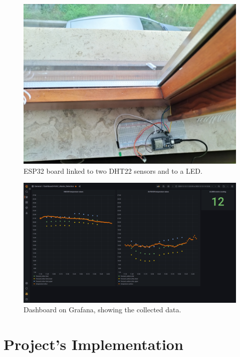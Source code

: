 \documentclass[conference]{IEEEtran}
\begin{document}
\begin{figure}[htbp]
\centerline{\includegraphics[scale=0.06]{figures/figure_esp.jpg}}
\caption{ESP32 board linked to two DHT22 sensors and to a LED.}
\label{fig_esp}
\end{figure}

\begin{figure}[htbp]
\centerline{\includegraphics[scale=0.125]{figures/figure_grafana.png}}
\caption{Dashboard on Grafana, showing the collected data.}
\label{fig_grafana}
\end{figure}


\section{Project’s Implementation}
\end{document}

